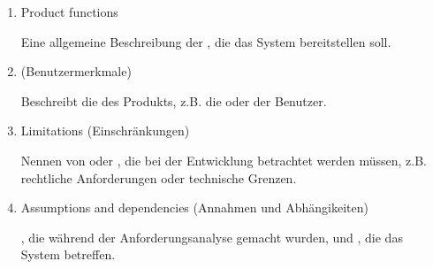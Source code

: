 \begin{defBox}[title=Requirements specification document (shortened from: ISO/IEC/IEEE 29148:2011)]
\begin{enumerate}
\begin{enumerate}
            \begin{infoBox}
                Beschreibt, wie sich das System in  oder  einfügt, einschließlich seiner Schnittstellen und Abhängigkeiten.
            \end{infoBox}
            \item Product functions
            \begin{infoBox}
                Eine allgemeine Beschreibung der , die das System bereitstellen soll.
            \end{infoBox}
            \item {} (Benutzermerkmale)
            \begin{infoBox}
                Beschreibt die  des Produkts, z.B. die  oder  der Benutzer.
            \end{infoBox}
            \item Limitations (Einschränkungen)
            \begin{infoBox}
                Nennen von  oder , die bei der Entwicklung betrachtet werden müssen, z.B. rechtliche Anforderungen oder technische Grenzen.
            \end{infoBox}
            \item Assumptions and dependencies (Annahmen und Abhängikeiten)
            \begin{infoBox}
                , die während der Anforderungsanalyse gemacht wurden, und , die das System betreffen.
            \end{infoBox}
        \end{enumerate}
    \end{enumerate}
\end{defBox}
